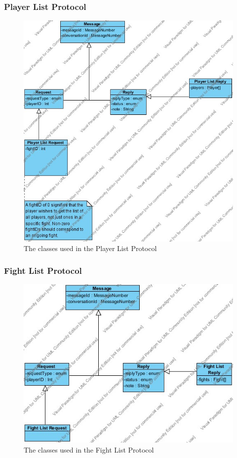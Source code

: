 \documentclass[12pt]{article}
\begin{document}
			\subsubsection{Player List Protocol}
				\begin{center}
					\begin{figure}[htp]
						\centering
						\includegraphics[width=\textwidth]{Diagrams/Class Diagrams/Player List Protocol.jpg}
						\caption{The classes used in the Player List Protocol}
					\end{figure}
				\end{center}
			\newpage
			\subsubsection{Fight List Protocol}
				\begin{center}
					\begin{figure}[htp]
						\centering
						\includegraphics[width=.8\textwidth]{Diagrams/Class Diagrams/Fight List Protocol.jpg}
						\caption{The classes used in the Fight List Protocol}
					\end{figure}
				\end{center}
			\newpage
\end{document}
